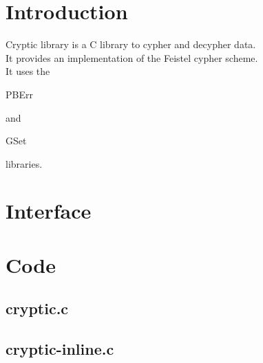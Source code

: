 \section*{Introduction}

Cryptic library is a C library to cypher and decypher data.\\

It provides an implementation of the Feistel cypher scheme.\\

It uses the \begin{ttfamily}PBErr\end{ttfamily} and \begin{ttfamily}GSet\end{ttfamily} libraries.\\

\section{Interface}

\begin{scriptsize}
\begin{ttfamily}

\end{ttfamily}
\end{scriptsize}

\section{Code}

\subsection{cryptic.c}

\begin{scriptsize}
\begin{ttfamily}

\end{ttfamily}
\end{scriptsize}

\subsection{cryptic-inline.c}

\begin{scriptsize}
\begin{ttfamily}

\end{ttfamily}
\end{scriptsize}

